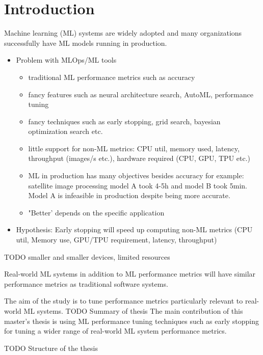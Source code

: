 \chapter{Introduction}

Machine learning (ML) systems are widely adopted and many organizations successfully have ML models running in production.

\begin{itemize}
    \item Problem with MLOps/ML tools
        \begin{itemize}
            \item traditional ML performance metrics such as accuracy
            \item fancy features such as neural architecture search, AutoML, performance tuning
            \item fancy techniques such as early stopping, grid search, bayesian optimization search etc.
            \item little support for non-ML metrics: CPU util, memory used, latency, throughput (images/s etc.), hardware required (CPU, GPU, TPU etc.)
            \item ML in production has many objectives besides accuracy for example: satellite image processing model A took 4-5h and model B took 5min. Model A is infeasible in production despite being more accurate.
            \item "Better' depends on the specific application
        \end{itemize}
    \item Hypothesis: Early stopping will speed up computing non-ML metrics (CPU util, Memory use, GPU/TPU requirement, latency, throughput)
\end{itemize}

TODO smaller and smaller devices, limited resources


Real-world ML systems in addition to ML performance metrics will have similar performance metrics as traditional software systems. 

The aim of the study is to tune performance metrics particularly relevant to real-world ML systems. 
TODO Summary of thesis
The main contribution of this master's thesis is using ML performance tuning techniques such as early stopping for tuning a wider range of real-world ML system performance metrics.



TODO Structure of the thesis